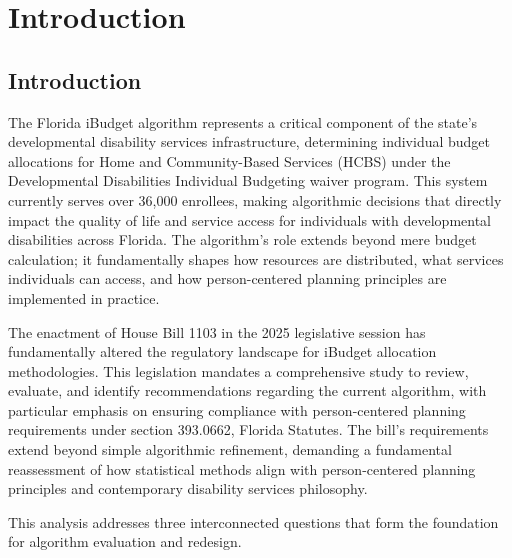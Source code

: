 ﻿%
\chapter{Introduction}  \newpage

\section{Introduction}

The Florida iBudget algorithm represents a critical component of the state's developmental disability services infrastructure, determining individual budget allocations for Home and Community-Based Services (HCBS) under the Developmental Disabilities Individual Budgeting waiver program. This system currently serves over 36,000 enrollees, making algorithmic decisions that directly impact the quality of life and service access for individuals with developmental disabilities across Florida. The algorithm's role extends beyond mere budget calculation; it fundamentally shapes how resources are distributed, what services individuals can access, and how person-centered planning principles are implemented in practice.

The enactment of House Bill 1103 in the 2025 legislative session has fundamentally altered the regulatory landscape for iBudget allocation methodologies. This legislation mandates a comprehensive study to review, evaluate, and identify recommendations regarding the current algorithm, with particular emphasis on ensuring compliance with person-centered planning requirements under section 393.0662, Florida Statutes. The bill's requirements extend beyond simple algorithmic refinement, demanding a fundamental reassessment of how statistical methods align with person-centered planning principles and contemporary disability services philosophy.

This analysis addresses three interconnected questions that form the foundation for algorithm evaluation and redesign. 




